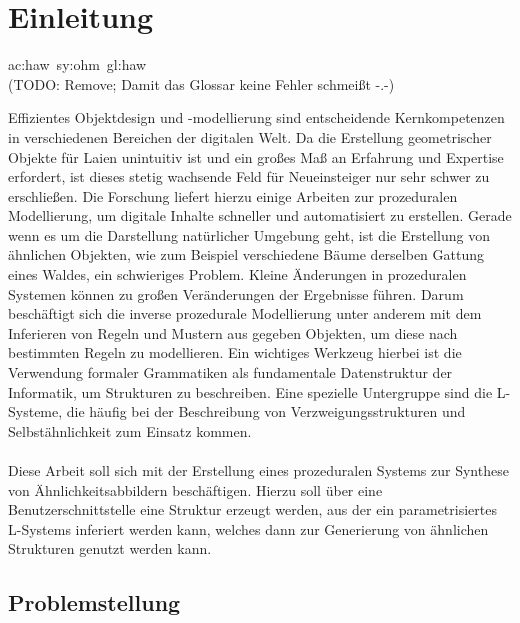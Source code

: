 
\chapter{Einleitung}
\gls{ac:haw}~\gls{sy:ohm}~\gls{gl:haw}\\(TODO: Remove; Damit das Glossar keine Fehler schmeißt -.-)

Effizientes Objektdesign und -modellierung sind entscheidende Kernkompetenzen in verschiedenen Bereichen der
digitalen Welt.
Da die Erstellung geometrischer Objekte für Laien unintuitiv ist und ein großes Maß an Erfahrung und Expertise
erfordert, ist dieses stetig wachsende Feld für Neueinsteiger nur sehr schwer zu erschließen.
Die Forschung liefert hierzu einige Arbeiten zur prozeduralen Modellierung, um digitale Inhalte schneller
und automatisiert zu erstellen.
Gerade wenn es um die Darstellung natürlicher Umgebung geht, ist die Erstellung von ähnlichen Objekten, wie
zum Beispiel verschiedene Bäume derselben Gattung eines Waldes, ein schwieriges Problem.
Kleine Änderungen in prozeduralen Systemen können zu großen Veränderungen der Ergebnisse führen.
Darum beschäftigt sich die inverse prozedurale Modellierung unter anderem mit dem Inferieren von Regeln
und Mustern aus gegeben Objekten, um diese nach bestimmten Regeln zu modellieren.
Ein wichtiges Werkzeug hierbei ist die Verwendung formaler Grammatiken als fundamentale Datenstruktur
der Informatik, um Strukturen zu beschreiben.
Eine spezielle Untergruppe sind die L-Systeme, die häufig bei der Beschreibung
von Verzweigungsstrukturen und Selbstähnlichkeit zum Einsatz kommen.
\\~\\
Diese Arbeit soll sich mit der Erstellung eines prozeduralen Systems zur Synthese von Ähnlichkeitsabbildern
beschäftigen.
Hierzu soll über eine Benutzerschnittstelle eine Struktur erzeugt werden, aus der ein parametrisiertes L-Systems
inferiert werden kann, welches dann zur Generierung von ähnlichen Strukturen genutzt werden kann.

\newpage

\section{Problemstellung}

